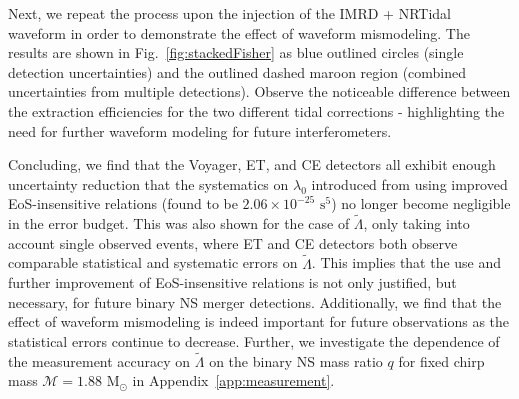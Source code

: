 \documentclass[prd,twocolumn,nofootinbib,superscriptaddress,amsmath,amssymb]{revtex4-1}
\begin{document}
Next, we repeat the process upon the injection of the IMRD + NRTidal waveform in order to demonstrate the effect of waveform mismodeling.
The results are shown in Fig.~\ref{fig:stackedFisher} as blue outlined circles (single detection uncertainties) and the outlined dashed maroon region (combined uncertainties from multiple detections).
Observe the noticeable difference between the extraction efficiencies for the two different tidal corrections - highlighting the need for further waveform modeling for future interferometers.

{}
{}

Concluding, we find that the Voyager, ET, and CE detectors all exhibit enough uncertainty reduction that the systematics on $\lambda_0$ introduced from using improved EoS-insensitive relations (found to be $2.06 \times 10^{-25}\text{ s}^5$) no longer become negligible in the error budget.
This was also shown for the case of $\tilde\Lambda$, only taking into account single observed events, where ET and CE detectors both observe comparable statistical and systematic errors on $\tilde\Lambda$.
This implies that the use and further improvement of EoS-insensitive relations is not only justified, but necessary, for future binary NS merger detections.
Additionally, we find that the effect of waveform mismodeling is indeed important for future observations as the statistical errors continue to decrease.
Further, we investigate the dependence of the measurement accuracy on $\tilde\Lambda$ on the binary NS mass ratio $q$ for fixed chirp mass $\mathcal{M}=1.88\text{ M}_{\odot}$ in Appendix~\ref{app:measurement}.

\end{document}
